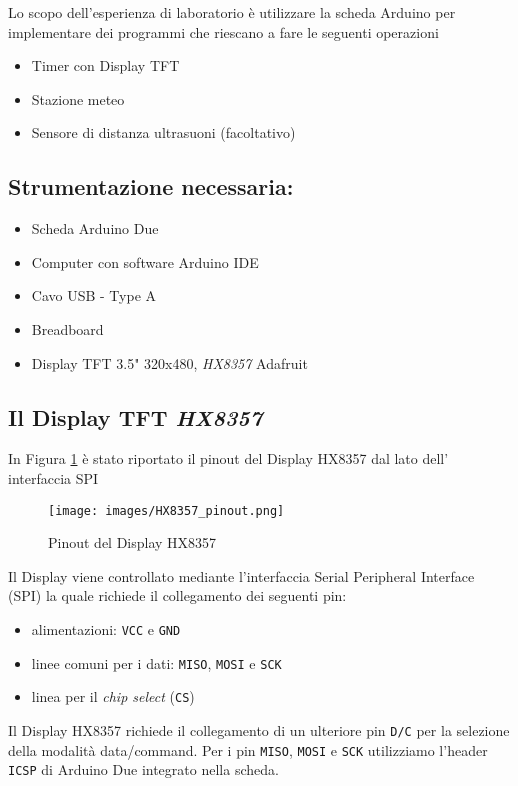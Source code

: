 Lo scopo dell'esperienza di laboratorio è utilizzare la scheda Arduino per implementare dei programmi che riescano a fare le seguenti operazioni
\begin{itemize}
    \item Timer con Display TFT
    \item Stazione meteo
    \item Sensore di distanza ultrasuoni (facoltativo)
\end{itemize}
\subsection*{Strumentazione necessaria:}
\begin{itemize}
    \item Scheda Arduino Due
    \item Computer con software Arduino IDE
    \item Cavo USB - Type A
    \item Breadboard
    \item Display TFT 3.5" 320x480, \textit{HX8357} Adafruit
\end{itemize}
\subsection*{Il Display TFT \textit{HX8357}}
In Figura \ref{fig:HX8357_pinout} è stato riportato il pinout del Display HX8357 dal lato dell' interfaccia SPI
\begin{figure}[H]
    \centering
    \texttt{[image: images/HX8357\_pinout.png]}
    \caption{Pinout del Display HX8357}
    \label{fig:HX8357_pinout}
\end{figure}
\noindent Il Display viene controllato mediante l'interfaccia Serial Peripheral Interface (SPI) la quale richiede il collegamento dei seguenti pin:
\begin{itemize}
    \item alimentazioni: \texttt{VCC} e \texttt{GND}
    \item linee comuni per i dati: \texttt{MISO}, \texttt{MOSI} e \texttt{SCK}
    \item linea per il \textit{chip select} (\texttt{CS})
\end{itemize}
Il Display HX8357 richiede il collegamento di un ulteriore pin \texttt{D/C} per la selezione della modalità data/command. Per i pin \texttt{MISO}, \texttt{MOSI} e \texttt{SCK} utilizziamo l'header \texttt{ICSP} di Arduino Due integrato nella scheda.
